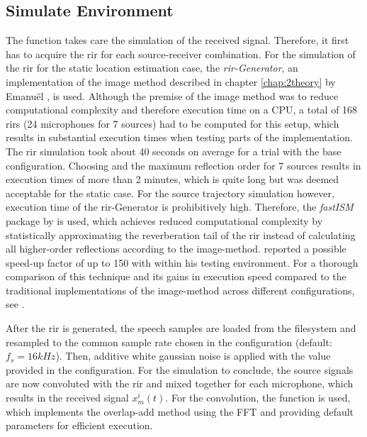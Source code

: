 \subsection{Simulate Environment}
The  function takes care the simulation of the received signal. Therefore, it first has to acquire the \gls{rir} for each source-receiver combination. For the simulation of the \gls{rir} for the static location estimation case, the \emph{\gls{rir}-Generator}, an implementation of the image method described in chapter \ref{chap:2theory} by Emanuël \citet*{Habets2014}, is used. Although the premise of the image method was to reduce computational complexity and therefore execution time on a CPU, a total of 168 \glspl{rir} (24 microphones for 7 sources) had to be computed for this setup, which results in substantial execution times when testing parts of the implementation. The \gls{rir} simulation took about 40 seconds on average for a trial with the base configuration. Choosing  and the maximum reflection order for 7 sources results in execution times of more than 2 minutes, which is quite long but was deemed acceptable for the static case. For the source trajectory simulation however, execution time of the \gls{rir}-Generator is prohibitively high. Therefore, the \emph{fastISM} package by \citeauthor{Lehmann2010} is used, which achieves reduced computational complexity by statistically approximating the reverberation tail of the \gls{rir} instead of calculating all higher-order reflections according to the image-method. \citeauthor{Lehmann2010} reported a possible speed-up factor of up to 150 with  within his testing environment. For a thorough comparison of this technique and its gains in execution speed compared to the traditional implementations of the image-method across different configurations, see \cite{Lehmann2010}.

After the \gls{rir} is generated, the speech samples are loaded from the filesystem and resampled to the common sample rate chosen in the configuration (default: $f_s=16kHz$). Then, additive white gaussian noise is applied with the  value provided in the configuration. For the simulation to conclude, the source signals are now convoluted with the \gls{rir} and mixed together for each microphone, which results in the received signal $x_m^i(t)$. For the convolution, the \matlab function  is used, which implements the overlap-add method using the FFT and providing default parameters for efficient execution.

